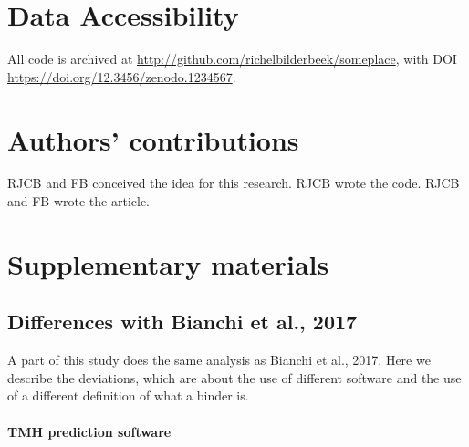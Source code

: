 \section{Data Accessibility}

All code is archived at \url{http://github.com/richelbilderbeek/someplace},
with DOI \url{https://doi.org/12.3456/zenodo.1234567}.

\section{Authors' contributions}

RJCB and FB conceived the idea for this research. 
RJCB wrote the code.
RJCB and FB wrote the article.





\appendix
\section{Supplementary materials}

\subsection{Differences with Bianchi et al., 2017}

A part of this study does the same analysis as Bianchi et al., 2017.
Here we describe the deviations, which are about the use of different
software and the use of a different definition of what a binder is.

\paragraph{TMH prediction software}


